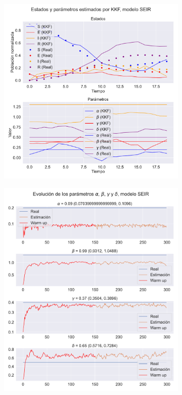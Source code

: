 \begin{figure}[h]
    \centering
    \begin{subfigure}[b]{0.49\textwidth}
         \includegraphics[height=\linewidth]{img/content/chapter4/nonlinear_filters_seir_params.pdf}
         \caption{}
         \label{fig:nonlinear_filters_seir_params}
    \end{subfigure}
    \begin{subfigure}[b]{0.49\textwidth}
         \includegraphics[height=\linewidth]{img/content/chapter4/nonlinear_filters_seir_params_evolution.pdf}

\end{subfigure}
\end{figure}
